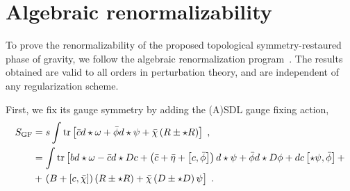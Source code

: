 \documentclass[../main.tex]{subfiles}
\begin{document}
\section{Algebraic renormalizability}%
\label{sec:quantum}

To prove the renormalizability of the proposed topological symmetry-restaured phase of gravity, we follow the algebraic renormalization program~\cite{piguet1995b}. The results obtained are valid to all orders in perturbation theory, and are independent of any regularization scheme.

First, we fix its gauge symmetry by adding the (A)SDL gauge fixing action,
\begin{subequations}%
  \label{eq:tg-gf-action}
  \begin{align}
    S_{\text{GF}} & = s \int \tr \left[ \bar{c} d \star \omega + \bar{\phi} d \star \psi + \bar{\chi} \left( R \pm \star R \right) \right] \;,                                                                                                                  \\
                  & = \int \tr \left[ b d \star \omega - \bar{c} d \star Dc + \left( \bar{c} + \bar{\eta} + \left[ c,\bar{\phi} \right] \right) d \star \psi + \bar{\phi} d \star D \phi + d c \left[ \star \psi ,\bar{\phi} \right] + \right. \nonumber        \\
                  & + \left. \left( B + \left[ c,\bar{\chi} \right] \right) \left( R \pm \star R \right) + \bar{\chi} \left( D \pm \star D \right) \psi \vphantom{ \left( \bar{c} + \bar{\eta} + \left[ c,\bar{\phi} \right] \right) d \star \psi } \right] \;.
  \end{align}
\end{subequations}
\end{document}
